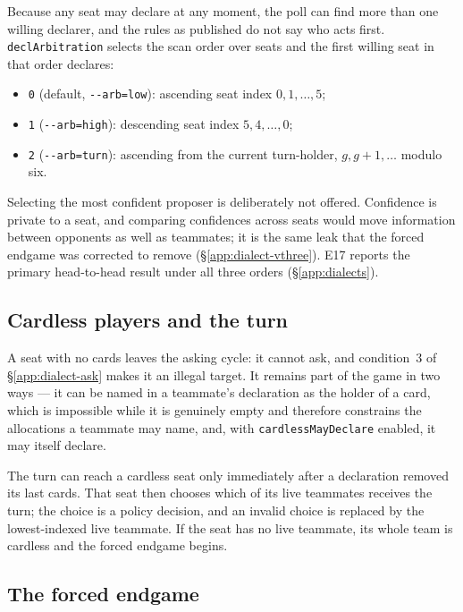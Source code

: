 \documentclass[11pt]{article}
\theoremstyle{definition}
\begin{document}
Because any seat may declare at any moment, the poll can find more than one
willing declarer, and the rules as published do not say who acts first.
\texttt{declArbitration} selects the scan order over seats and the first willing
seat in that order declares:

\begin{itemize}
  \item \texttt{0} (default, \texttt{-{}-arb=low}): ascending seat index
        $0,1,\dots,5$;
  \item \texttt{1} (\texttt{-{}-arb=high}): descending seat index
        $5,4,\dots,0$;
  \item \texttt{2} (\texttt{-{}-arb=turn}): ascending from the current
        turn-holder, $g, g+1, \dots$ modulo six.
\end{itemize}

Selecting the most confident proposer is deliberately not offered. Confidence is
private to a seat, and comparing confidences across seats would move information
between opponents as well as teammates; it is the same leak that the forced
endgame was corrected to remove (\S\ref{app:dialect-vthree}). E17 reports the primary
head-to-head result under all three orders (\S\ref{app:dialects}).

\subsection{Cardless players and the turn}
\label{app:dialect-cardless}

A seat with no cards leaves the asking cycle: it cannot ask, and condition~3 of
\S\ref{app:dialect-ask} makes it an illegal target. It remains part of the game
in two ways --- it can be named in a teammate's declaration as the holder of a
card, which is impossible while it is genuinely empty and therefore constrains
the allocations a teammate may name, and, with \texttt{cardlessMayDeclare}
enabled, it may itself declare.

The turn can reach a cardless seat only immediately after a declaration removed
its last cards. That seat then chooses which of its live teammates receives the
turn; the choice is a policy decision, and an invalid choice is replaced by the
lowest-indexed live teammate. If the seat has no live teammate, its whole team is
cardless and the forced endgame begins.

\subsection{The forced endgame}
\label{app:dialect-endgame}
\end{document}
